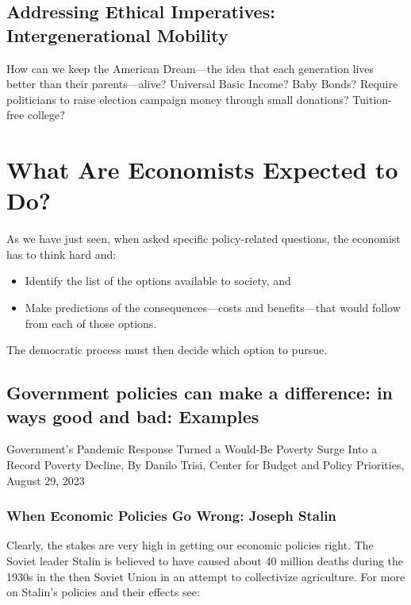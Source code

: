 \documentclass[
  letterpaper,
]{book}
\begin{document}
\subsection{Addressing Ethical Imperatives: Intergenerational
Mobility}\label{addressing-ethical-imperatives-intergenerational-mobility}

How can we keep the American Dream---the idea that each generation lives
better than their parents---alive? Universal Basic Income? Baby Bonds?
Require politicians to raise election campaign money through small
donations? Tuition-free college?

\section{What Are Economists Expected to
Do?}\label{what-are-economists-expected-to-do}

As we have just seen, when asked specific policy-related questions, the
economist has to think hard and:

\begin{itemize}
\item
  Identify the list of the options available to society, and
\item
  Make predictions of the consequences---costs and benefits---that would
  follow from each of those options.
\end{itemize}

The democratic process must then decide which option to pursue.

\subsection{Government policies can make a difference: in ways good and
bad:
Examples}\label{government-policies-can-make-a-difference-in-ways-good-and-bad-examples}

Government's Pandemic Response Turned a Would-Be Poverty Surge Into a
Record Poverty Decline, By Danilo Trisi, Center for Budget and Policy
Priorities, August 29, 2023

\subsubsection{When Economic Policies Go Wrong: Joseph
Stalin}\label{when-economic-policies-go-wrong-joseph-stalin}

Clearly, the stakes are very high in getting our economic policies
right. The Soviet leader Stalin is believed to have caused about 40
million deaths during the 1930s in the then Soviet Union in an attempt
to collectivize agriculture. For more on Stalin's policies and their
effects see:
\end{document}
